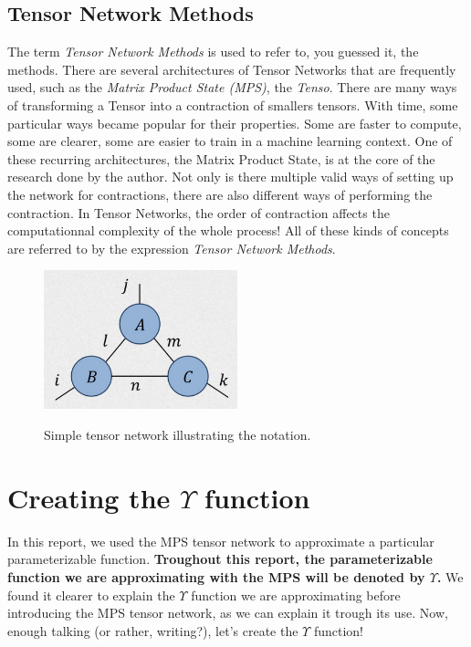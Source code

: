 \documentclass{article}
\theoremstyle{definition}
\theoremstyle{definition}
\begin{document}
\subsection{Tensor Network Methods}
The term {\it Tensor Network Methods} is used to refer to, you guessed it, the methods.
There are several architectures of Tensor Networks that are frequently used, such as the {\it Matrix Product State (MPS)}, the {\it Tenso}.
There are many ways of transforming a Tensor into a contraction of smallers tensors. 
With time, some particular ways became popular for their properties. 
Some are faster to compute, some are clearer, some are easier to train in a machine learning context. 
One of these recurring architectures, the Matrix Product State, is at the core of the research done by the author.
Not only is there multiple valid ways of setting up the network for contractions, there are also different ways of performing the contraction.
In Tensor Networks, the order of contraction affects the computationnal complexity of the whole process!
All of these kinds of concepts are referred to by the expression \emph{Tensor Network Methods}.


\begin{figure}[h]
\centering
\caption{Simple tensor network illustrating the notation.}
\includegraphics[width=0.5\textwidth]{images/2023-03-21-10-22-39.png}
\label{fig:tensor_net}
\end{figure}

\section{Creating the $\Upsilon$ function}
In this report, we used the MPS tensor network to approximate a particular parameterizable function.
{\bf Troughout this report, the parameterizable function we are approximating with the MPS will be denoted by $\Upsilon$. }
We found it clearer to explain the $\Upsilon$ function we are approximating before introducing the MPS tensor network, as we can explain it trough its use.
Now, enough talking (or rather, writing?), let's create the $\Upsilon$ function!
\end{document}
